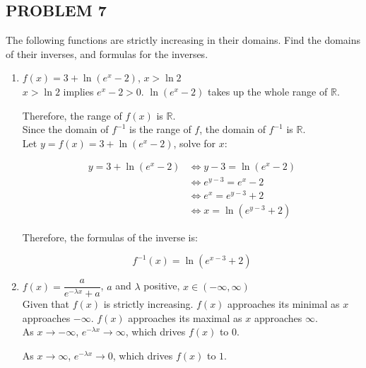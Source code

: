 \documentclass{article}
\begin{document}
\subsection*{PROBLEM 7}

The following functions are strictly increasing in their domains. Find the domains of their inverses, and formulas for the inverses.

\begin{enumerate}[label=(\alph*)]

\item $f(x) = 3 + \ln{(e^x - 2)}$, $x > \ln{2}$ \\

$x>\ln{2}$ implies $e^x-2>0$. $\ln{(e^x - 2)}$ takes up the whole range of $\mathbb{R}$. 

Therefore, the range of $f(x)$ is $\mathbb{R}$. \\

Since the domain of $f^{-1}$ is the range of $f$, the domain of $f^{-1}$ is $\mathbb{R}$. \\

Let $y = f(x) = 3 + \ln{(e^x - 2)}$, solve for $x$:

\begin{equation*}
\begin{aligned}
y = 3 + \ln{(e^x - 2)} &\iff
y - 3 = \ln{(e^x - 2)} \\ &\iff
e^{y - 3} = e^x - 2 \\ &\iff
e^x = e^{y - 3} + 2 \\ &\iff
x = \ln{(e^{y - 3} + 2)}
\end{aligned}
\end{equation*}

Therefore, the formulas of the inverse is:

$$ f^{-1}(x) = \ln{(e^{x - 3} + 2)} $$ 

\item $f(x) = \dfrac{a}{e^{-\lambda x} + a}$, $a$ and $\lambda$ positive, $x \in (-\infty, \infty)$ \\

Given that $f(x)$ is strictly increasing. $f(x)$ approaches its minimal as $x$ approaches $-\infty$. $f(x)$ approaches its maximal as $x$ approaches $\infty$. \\

As $x \to -\infty$, $e^{-\lambda x} \to \infty$, which drives $f(x)$ to $0$.

As $x \to \infty$, $e^{-\lambda x} \to 0$, which drives $f(x)$ to $1$. \\


\end{enumerate}
\end{document}

